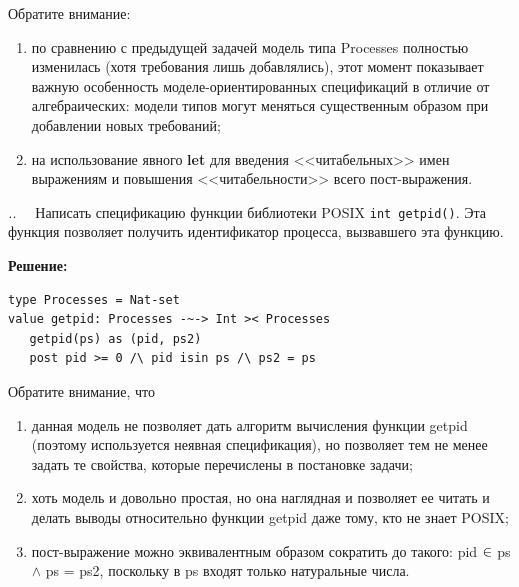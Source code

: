 \documentclass[14pt, twoside]{extreport}
\newcounter{problem_type}[chapter]
\newcounter{zadacha}[problem_type]
\newcommand{\z}{\vspace{0.5cm}\par\addtocounter{zadacha}{1}%
\textit{\arabic{chapter}.\arabic{problem_type}.\arabic{zadacha}}~~  }
\newcommand{\head}[1]{\vspace{1cm}\subsubsection*{#1}}
\newcommand{\zhead}[1]{\head{#1} \refstepcounter{problem_type}}
\begin{document}
Обратите внимание:
\begin{enumerate}
  \item по сравнению с предыдущей задачей модель типа Processes полностью изменилась (хотя требования лишь добавлялись), этот момент показывает важную особенность моделе-ориентированных спецификаций в отличие от алгебраических: модели типов могут меняться существенным образом при добавлении новых требований;
  \item на использование явного \textbf{let} для введения <<читабельных>> имен выражениям и повышения <<читабельности>> всего пост-выражения.
\end{enumerate}

\z Написать спецификацию функции библиотеки POSIX \texttt{int getpid()}. Эта функция позволяет получить идентификатор процесса, вызвавшего эта функцию.

\textbf{Решение:}
\begin{lstlisting}
type Processes = Nat-set
value getpid: Processes -~-> Int >< Processes
   getpid(ps) as (pid, ps2)
   post pid >= 0 /\ pid isin ps /\ ps2 = ps
\end{lstlisting}

Обратите внимание, что
\begin{enumerate}
  \item данная модель не позволяет дать алгоритм вычисления функции getpid (поэтому используется неявная спецификация), но позволяет тем не менее задать те свойства, которые перечислены в постановке задачи;
  \item хоть модель и довольно простая, но она наглядная и позволяет ее читать и делать выводы относительно функции getpid даже тому, кто не знает POSIX;
  \item пост-выражение можно эквивалентным образом сократить до такого: pid $\in$ ps $\wedge$ ps = ps2, поскольку в ps входят только натуральные числа.
\end{enumerate}





\end{document}
